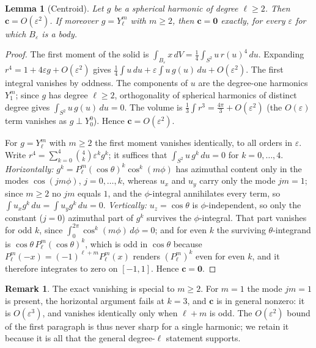 \documentclass[11pt,a4paper]{article}
\newtheorem{lemma}{Lemma}
\theoremstyle{definition}
\newtheorem{remark}{Remark}
\begin{document}
\begin{lemma}[Centroid]\label{lem:centroid}
Let $g$ be a spherical harmonic of degree $\ell\ge2$. Then $\mathbf{c}=O(\varepsilon^2)$. If moreover
$g=Y_\ell^m$ with $m\ge2$, then $\mathbf{c}=\mathbf{0}$ \emph{exactly}, for every $\varepsilon$ for which
$B_\varepsilon$ is a body.
\end{lemma}
\begin{proof}
The first moment of the solid is $\int_{B_\varepsilon}x\,dV=\tfrac14\int_{S^2}u\,r(u)^4\,du$. Expanding
$r^4=1+4\varepsilon g+O(\varepsilon^2)$ gives
$\tfrac14\!\int u\,du + \varepsilon\!\int u\,g(u)\,du + O(\varepsilon^2)$. The first integral vanishes by
oddness. The components of $u$ are the degree-one harmonics $Y_1^{m}$; since $g$ has degree $\ell\ge2$,
orthogonality of spherical harmonics of distinct degree gives $\int_{S^2}u\,g(u)\,du=0$. The volume is
$\tfrac13\int r^3=\tfrac{4\pi}{3}+O(\varepsilon^2)$ (the $O(\varepsilon)$ term vanishes as $g\perp Y_0^0$).
Hence $\mathbf{c}=O(\varepsilon^2)$.

For $g=Y_\ell^m$ with $m\ge2$ the first moment vanishes identically, to all orders in $\varepsilon$. Write
$r^4=\sum_{k=0}^{4}\binom{4}{k}\varepsilon^k g^k$; it suffices that $\int_{S^2}u\,g^k\,du=0$ for
$k=0,\dots,4$. \emph{Horizontally:} $g^k=P_\ell^m(\cos\theta)^k\cos^k(m\phi)$ has azimuthal content only in
the modes $\cos(jm\phi)$, $j=0,\dots,k$, whereas $u_x$ and $u_y$ carry only the mode $j m=1$; since $m\ge2$
no $jm$ equals $1$, and the $\phi$-integral annihilates every term, so
$\int u_x g^k\,du=\int u_y g^k\,du=0$. \emph{Vertically:} $u_z=\cos\theta$ is $\phi$-independent, so only the
constant ($j=0$) azimuthal part of $g^k$ survives the $\phi$-integral. That part vanishes for odd $k$, since
$\int_0^{2\pi}\cos^k(m\phi)\,d\phi=0$; and for even $k$ the surviving $\theta$-integrand is
$\cos\theta\,P_\ell^m(\cos\theta)^k$, which is odd in $\cos\theta$ because $P_\ell^m(-x)=(-1)^{\ell+m}
P_\ell^m(x)$ renders $(P_\ell^m)^k$ even for even $k$, and it therefore integrates to zero on $[-1,1]$.
Hence $\mathbf{c}=\mathbf{0}$.
\end{proof}

\begin{remark}\label{rem:m1centroid}
The exact vanishing is special to $m\ge2$. For $m=1$ the mode $jm=1$ is present, the horizontal argument
fails at $k=3$, and $\mathbf{c}$ is in general nonzero: it is $O(\varepsilon^3)$, and vanishes identically
only when $\ell+m$ is odd. The $O(\varepsilon^2)$ bound of the first paragraph is thus never sharp for a
single harmonic; we retain it because it is all that the general degree-$\ell$ statement supports.
\end{remark}
\end{document}
